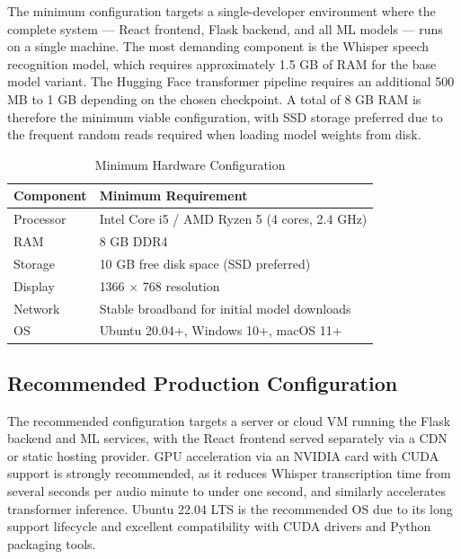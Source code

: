 \documentclass[12pt, a4paper]{report}
\begin{document}
The minimum configuration targets a single-developer environment where the complete system --- React frontend, Flask backend, and all ML models --- runs on a single machine. The most demanding component is the Whisper speech recognition model, which requires approximately 1.5 GB of RAM for the base model variant. The Hugging Face transformer pipeline requires an additional 500 MB to 1 GB depending on the chosen checkpoint. A total of 8 GB RAM is therefore the minimum viable configuration, with SSD storage preferred due to the frequent random reads required when loading model weights from disk.

\begin{table}[H]
\centering
\caption{Minimum Hardware Configuration}
\label{tab:hw-min}
\small
\begin{tabularx}{\textwidth}{|l|X|}
\hline
\textbf{Component} & \textbf{Minimum Requirement} \\
\hline
Processor & Intel Core i5 / AMD Ryzen 5 (4 cores, 2.4 GHz) \\
\hline
RAM & 8 GB DDR4 \\
\hline
Storage & 10 GB free disk space (SSD preferred) \\
\hline
Display & 1366 $\times$ 768 resolution \\
\hline
Network & Stable broadband for initial model downloads \\
\hline
OS & Ubuntu 20.04+, Windows 10+, macOS 11+ \\
\hline
\end{tabularx}
\end{table}

\subsection{Recommended Production Configuration}

The recommended configuration targets a server or cloud VM running the Flask backend and ML services, with the React frontend served separately via a CDN or static hosting provider. GPU acceleration via an NVIDIA card with CUDA support is strongly recommended, as it reduces Whisper transcription time from several seconds per audio minute to under one second, and similarly accelerates transformer inference. Ubuntu 22.04 LTS is the recommended OS due to its long support lifecycle and excellent compatibility with CUDA drivers and Python packaging tools.
\end{document}

